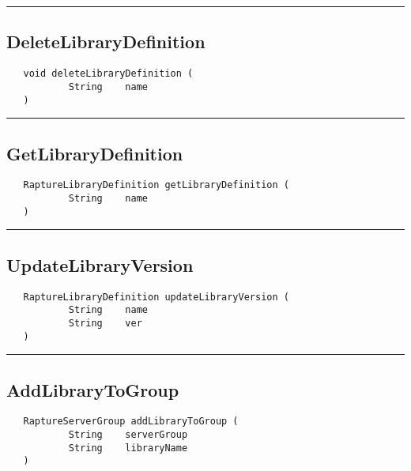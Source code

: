 \rule{15cm}{2pt}
\subsection{DeleteLibraryDefinition}
\label{Api:DeleteLibraryDefinition}
\begin{verbatim}
   void deleteLibraryDefinition (
           String    name
   )
\end{verbatim}



\rule{15cm}{2pt}
\subsection{GetLibraryDefinition}
\label{Api:GetLibraryDefinition}
\begin{verbatim}
   RaptureLibraryDefinition getLibraryDefinition (
           String    name
   )
\end{verbatim}



\rule{15cm}{2pt}
\subsection{UpdateLibraryVersion}
\label{Api:UpdateLibraryVersion}
\begin{verbatim}
   RaptureLibraryDefinition updateLibraryVersion (
           String    name
           String    ver
   )
\end{verbatim}



\rule{15cm}{2pt}
\subsection{AddLibraryToGroup}
\label{Api:AddLibraryToGroup}
\begin{verbatim}
   RaptureServerGroup addLibraryToGroup (
           String    serverGroup
           String    libraryName
   )
\end{verbatim}



